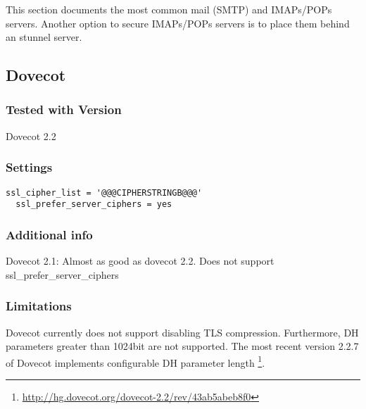 
This section documents the most common mail (SMTP) and IMAPs/POPs servers. Another option to secure IMAPs/POPs servers is to place them behind an stunnel server. 

\subsection{Dovecot}


\subsubsection{Tested with Version} Dovecot 2.2

\subsubsection{Settings}

\begin{lstlisting}[breaklines]
  ssl_cipher_list = '@@@CIPHERSTRINGB@@@'
  ssl_prefer_server_ciphers = yes
\end{lstlisting}

\subsubsection{Additional info}

Dovecot 2.1: Almost as good as dovecot 2.2. Does not support
ssl\_prefer\_server\_ciphers

\subsubsection{Limitations}

Dovecot currently does not support disabling TLS compression. Furthermore, DH
parameters greater than 1024bit are not supported. The most recent version
2.2.7 of Dovecot implements configurable DH parameter length
\footnote{\url{http://hg.dovecot.org/dovecot-2.2/rev/43ab5abeb8f0}}.



